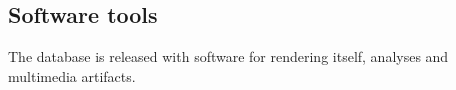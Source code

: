 																																																																																																																																																																																																																																																																																																																																																																																																															\subsection{Software tools}
																																																																																																																																																																																																																																																																																																																																																																																																															The database is released with software for rendering itself, analyses and
																																																																																																																																																																																																																																																																																																																																																																																																															multimedia artifacts.
